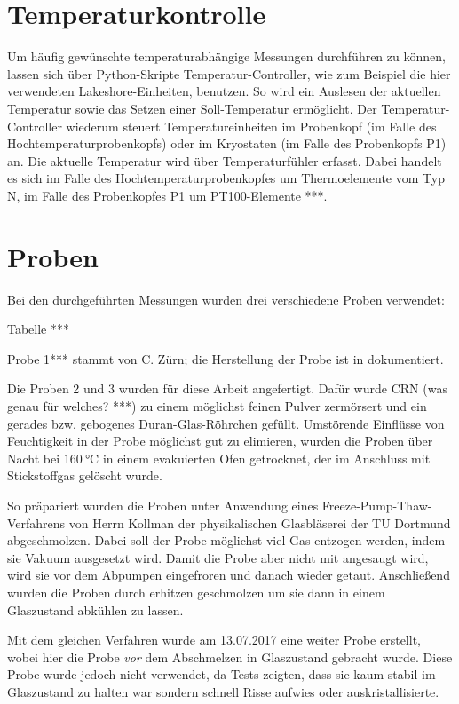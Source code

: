 \section{Temperaturkontrolle} \label{section:exp:temperaturkontrolle}

Um häufig gewünschte temperaturabhängige Messungen durchführen zu können, lassen sich über Python-Skripte Temperatur-Controller, wie zum Beispiel die hier verwendeten Lakeshore-Einheiten, benutzen. So wird ein Auslesen der aktuellen Temperatur sowie das Setzen einer Soll-Temperatur ermöglicht. Der Temperatur-Controller wiederum steuert Temperatureinheiten im Probenkopf (im Falle des Hochtemperaturprobenkopfs) oder im Kryostaten (im Falle des Probenkopfs P1) an. Die aktuelle Temperatur wird über Temperaturfühler erfasst. Dabei handelt es sich im Falle des Hochtemperaturprobenkopfes um Thermoelemente vom Typ N, im Falle des Probenkopfes P1 um PT100-Elemente ***.





\section{Proben} \label{section:exp:proben}

Bei den durchgeführten Messungen wurden drei verschiedene Proben verwendet:

Tabelle ***

Probe 1*** stammt von C. Zürn; die Herstellung der Probe ist in \cite{zuern_arbeit} dokumentiert.

Die Proben 2 und 3 wurden für diese Arbeit angefertigt. Dafür wurde CRN (was genau für welches? ***) zu einem möglichst feinen Pulver zermörsert und ein gerades bzw. gebogenes Duran-Glas-Röhrchen gefüllt. Umstörende Einflüsse von Feuchtigkeit in der Probe möglichst gut zu elimieren, wurden die Proben über Nacht bei $\SI{160}{\degreeCelsius}$ in einem evakuierten Ofen getrocknet, der im Anschluss mit Stickstoffgas gelöscht wurde.

So präpariert wurden die Proben unter Anwendung eines Freeze-Pump-Thaw-Verfahrens von Herrn Kollman der physikalischen Glasbläserei der TU Dortmund abgeschmolzen. Dabei soll der Probe möglichst viel Gas entzogen werden, indem sie Vakuum ausgesetzt wird. Damit die Probe aber nicht mit angesaugt wird, wird sie vor dem Abpumpen eingefroren und danach wieder getaut.  Anschließend wurden die Proben durch erhitzen geschmolzen um sie dann in einem Glaszustand abkühlen zu lassen.

Mit dem gleichen Verfahren wurde am 13.07.2017 eine weiter Probe erstellt, wobei hier die Probe \emph{vor} dem Abschmelzen in Glaszustand gebracht wurde. Diese Probe wurde jedoch nicht verwendet, da Tests zeigten, dass sie kaum stabil im Glaszustand zu halten war sondern schnell Risse aufwies oder auskristallisierte.
